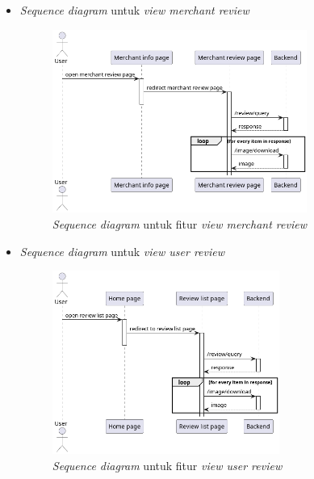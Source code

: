 \documentclass[a4paper]{article}
\begin{document}
\begin{enumerate}
\begin{enumerate}
\begin{itemize}
            \newpage
            \item \textit{Sequence diagram} untuk \textit{view merchant review}
            \begin{figure}[h]
                \centering
                \includegraphics*[height=6cm]{diagram/sequence diagram/FE/16. review/view merchant review/template.png}
                \caption{\textit{Sequence diagram} untuk fitur \textit{view merchant review}}
            \end{figure}

            \item \textit{Sequence diagram} untuk \textit{view user review}
            \begin{figure}[h]
                \centering
                \includegraphics*[height=6cm]{diagram/sequence diagram/FE/16. review/view user review/template.png}
                \caption{\textit{Sequence diagram} untuk fitur \textit{view user review}}
            \end{figure}


\end{itemize}
\end{enumerate}
\end{enumerate}
\end{document}
